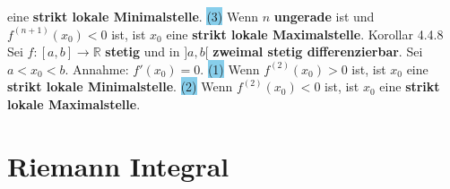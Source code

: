 \documentclass[landscape, 10pt]{article}
\newcommand{\R}{\mathbb{R}}
\begin{document}
\begin{multicols}{3}
                eine \textbf{strikt lokale Minimalstelle}. 
         \colorbox{SkyBlue}{(3)} Wenn \textcolor{NavyBlue}{$n$} \textbf{ungerade} 
                ist und \textcolor{NavyBlue}{$f^{(n+1)}(x_0)<0$} ist, ist 
                \textcolor{NavyBlue}{$x_0$} eine 
                \textbf{strikt lokale Maximalstelle}. 
\colorbox{BurntOrange}{Korollar 4.4.8} Sei 
                \textcolor{NavyBlue}{$f:[a,b]\longrightarrow\R$} 
                \textbf{stetig} und in \textcolor{NavyBlue}{$]a,b[$}
                \textbf{zweimal stetig differenzierbar}. Sei \textcolor{NavyBlue}{$a<x_0<b$}. 
         Annahme: \textcolor{NavyBlue}{$f'(x_0)=0$}.
         \colorbox{SkyBlue}{(1)} Wenn \textcolor{NavyBlue}{$f^{(2)}(x_0)>0$} ist, ist 
                \textcolor{NavyBlue}{$x_0$}
                eine \textbf{strikt lokale Minimalstelle}. 
         \colorbox{SkyBlue}{(2)} Wenn \textcolor{NavyBlue}{$f^{(2)}(x_0)<0$} ist, ist
                \textcolor{NavyBlue}{$x_0$}
                eine \textbf{strikt lokale Maximalstelle}.

\section{Riemann Integral}

\end{multicols}
\end{document}

